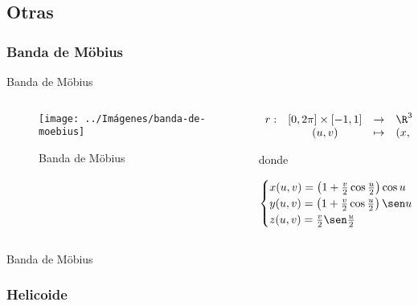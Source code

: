 \documentclass[10pt]{beamer}
\begin{document}
	\subsection{Otras}
	
	\subsubsection{Banda de Möbius}
	
	\begin{frame}{Banda de Möbius}
		\begin{columns}[t] %
			\begin{column}{.50\textwidth}
				\begin{figure}
					\centering
					\texttt{[image: ../Imágenes/banda-de-moebius]}
					\caption{Banda de Möbius}
					\label{fig:banda-de-moebius}
				\end{figure}
			\end{column}%
			\hfill%
			\begin{column}{.50\textwidth}
				$$\begin{array}{rcll}
				r : & [0, 2\pi] \times [-1,1] & \to & \R^3\\
				& (u,v) & \mapsto & (x,y,z)
				\end{array}$$
				
				donde 
				
				$$ \begin{cases}
				x(u,v) = \left( 1 + \frac{v}{2}\cos\frac{u}{2} \right)\cos u \\
				y(u,v) = \left( 1 + \frac{v}{2}\cos\frac{u}{2} \right)\sen u \\
				z(u,v) = \frac{v}{2}\sen\frac{u}{2}
				\end{cases} $$
			\end{column}%
		\end{columns}
	\end{frame}
	
	\begin{frame}{Banda de Möbius}
	\end{frame}
	
	\subsubsection{Helicoide}
	
\end{document}

